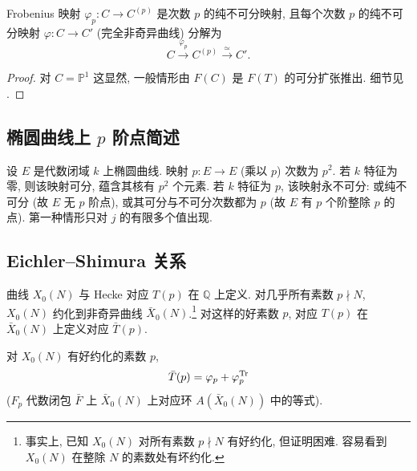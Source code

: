 \begin{proposition} \label{thm:5.7.3} 
Frobenius 映射 $\varphi_p\colon C\to C^{(p)}$ 是次数 $p$ 的纯不可分映射, 且每个次数 $p$ 的纯不可分映射 $\varphi\colon C\to C'$ (完全非奇异曲线) 分解为
\[
C \xrightarrow{\varphi_p} C^{(p)} \xrightarrow{\simeq} C'.
\]
\end{proposition}

\begin{proof}
对 $C = \mathbb{P}^1$ 这显然, 一般情形由 $F(C)$ 是 $F(T)$ 的可分扩张推出. 细节见 \cite[II, 2.12]{silverman2009}.
\end{proof}

\subsection*{椭圆曲线上 $p$ 阶点简述}

设 $E$ 是代数闭域 $k$ 上椭圆曲线. 映射 $p\colon E\to E$ (乘以 $p$) 次数为 $p^2$. 若 $k$ 特征为零, 则该映射可分, 蕴含其核有 $p^2$ 个元素. 若 $k$ 特征为 $p$, 该映射永不可分: 或纯不可分 (故 $E$ 无 $p$ 阶点), 或其可分与不可分次数都为 $p$ (故 $E$ 有 $p$ 个阶整除 $p$ 的点). 第一种情形只对 $j$ 的有限多个值出现.

\subsection*{Eichler--Shimura 关系}

曲线 $X_0(N)$ 与 Hecke 对应 $T(p)$ 在 $\mathbb{Q}$ 上定义. 对几乎所有素数 $p\nmid N$, $X_0(N)$ 约化到非奇异曲线 $\bar{X}_0(N)$.\footnote{事实上, 已知 $X_0(N)$ 对所有素数 $p\nmid N$ 有好约化, 但证明困难. 容易看到 $X_0(N)$ 在整除 $N$ 的素数处有坏约化.} 对这样的好素数 $p$, 对应 $T(p)$ 在 $\bar{X}_0(N)$ 上定义对应 $\bar{T}(p)$.

\begin{theorem} \label{thm:5.7.4} 
对 $X_0(N)$ 有好约化的素数 $p$,
\[
\bar{T}(p) = \varphi_p + \varphi_p^{\operatorname{Tr}}
\]
($F_p$ 代数闭包 $\bar{F}$ 上 $\bar{X}_0(N)$ 上对应环 $A(\bar{X}_0(N))$ 中的等式).
\end{theorem}

